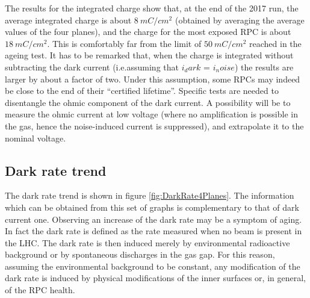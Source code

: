 The results for the integrated charge show that, at the end of the 2017 run, the average integrated charge is about $8\ mC/cm^2$ (obtained by averaging the average values of the four planes), and the charge for the most exposed RPC is about $18\ mC/cm^2$. 
This is comfortably far from the limit of $50\ mC/cm^2$ reached in the ageing test. 
It has to be remarked that, when the charge is integrated without subtracting the dark current (i.e.assuming that $i_dark$ = $i_noise$) the results are larger by about a factor of two. 
Under this assumption, some RPCs may indeed be close to the end of their “certified lifetime”. 
Specific tests are needed to disentangle the ohmic component of the dark current. 
A possibility will be to measure the ohmic current at low voltage (where no amplification is possible in the gas, hence the noise-induced current is suppressed), and extrapolate it to the nominal voltage.

\subsection{Dark rate trend}
The dark rate trend is shown in figure \ref{fig:DarkRate4Planes}.
The information which can be obtained from this set of graphs is complementary to that of dark current one.
Observing an increase of the dark rate may be a symptom of aging.
In fact the dark rate is defined as the rate measured when no beam is present in the LHC.
The dark rate is then induced merely by environmental radioactive background or by spontaneous discharges in the gas gap.
For this reason, assuming the environmental background to be constant, any modification of the dark rate is induced by physical modifications of the inner surfaces or, in general, of the RPC health.

